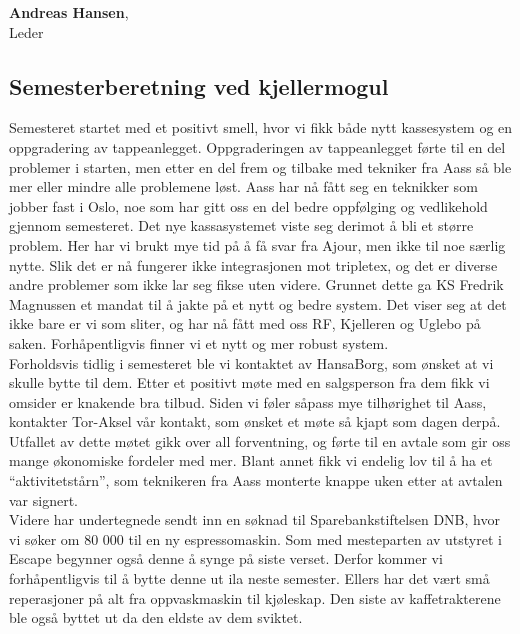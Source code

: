 \documentclass[10pt,norsk,a4paper]{article}
\begin{document}
\textbf{Andreas Hansen},\\
Leder \\
\date{2.\ mai 2018}
\newpage


\subsection{Semesterberetning ved kjellermogul}

\begin{multicols}{2}
Semesteret startet med et positivt smell, hvor vi fikk både nytt kassesystem og en oppgradering av tappeanlegget. Oppgraderingen av tappeanlegget førte til en del problemer i starten, men etter en del frem og tilbake med tekniker fra Aass så ble mer eller mindre alle problemene løst. Aass har nå fått seg en teknikker som jobber fast i Oslo, noe som har gitt oss en del bedre oppfølging og vedlikehold gjennom semesteret. Det nye kassasystemet viste seg derimot å bli et større problem. Her har vi brukt mye tid på å få svar fra Ajour, men ikke til noe særlig nytte. Slik det er nå fungerer ikke integrasjonen mot tripletex, og det er diverse andre problemer som ikke lar seg fikse uten videre. Grunnet dette ga KS Fredrik Magnussen et mandat til å jakte på et nytt og bedre system. Det viser seg at det ikke bare er vi som sliter, og har nå fått med oss RF, Kjelleren og Uglebo på saken. Forhåpentligvis finner vi et nytt og mer robust system.\\

Forholdsvis tidlig i semesteret ble vi kontaktet av HansaBorg, som ønsket at vi skulle bytte til dem. Etter et positivt møte med en salgsperson fra dem fikk vi omsider er knakende bra tilbud. Siden vi føler såpass mye tilhørighet til Aass, kontakter Tor-Aksel vår kontakt, som ønsket et møte så kjapt som dagen derpå. Utfallet av dette møtet gikk over all forventning, og førte til en avtale som gir oss mange økonomiske fordeler med mer. Blant annet fikk vi endelig lov til å ha et “aktivitetstårn”, som teknikeren fra Aass monterte knappe uken etter at avtalen var signert.\\

Videre har undertegnede sendt inn en søknad til Sparebankstiftelsen DNB, hvor vi søker om 80 000 til en ny espressomaskin. Som med mesteparten av utstyret i Escape begynner også denne å synge på siste verset. Derfor kommer vi forhåpentligvis til å bytte denne ut ila neste semester. Ellers har det vært små reperasjoner på alt fra oppvaskmaskin til kjøleskap. Den siste av kaffetrakterene ble også byttet ut da den eldste av dem sviktet.\\


\end{multicols}
\end{document}
